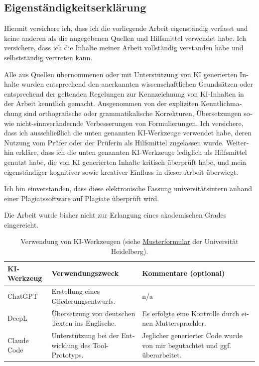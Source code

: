 \documentclass[
    pdftex,
    final,
    11pt,
    a4paper,
    parskip=false, %
    twoside, %
    footheight=0mm, %
    footinclude=false,
    toc=bibliography, %
    toc=listof %
]{scrbook} %
\begin{document}
\begin{otherlanguage}{ngerman}
\chapter*{Eigenständigkeitserklärung}
	
\vspace{1cm}
\noindent
Hiermit versichere ich, dass ich die vorliegende Arbeit eigenständig verfasst und keine anderen als die angegebenen Quellen und Hilfsmittel verwendet habe.
Ich versichere, dass ich die Inhalte meiner Arbeit vollständig verstanden habe und selbstständig vertreten kann.

Alle aus Quellen übernommenen oder mit Unterstützung von KI generierten Inhalte wurden entsprechend den anerkannten wissenschaftlichen Grundsätzen oder entsprechend der geltenden Regelungen zur Kennzeichnung von KI-Inhalten in der Arbeit kenntlich gemacht.
Ausgenommen von der expliziten Kenntlichmachung sind orthografische oder grammatikalische Korrekturen, Übersetzungen sowie nicht-sinnverändernde Verbesserungen von Formulierungen.
Ich versichere, dass ich ausschließlich die unten genannten KI-Werkzeuge verwendet habe, deren Nutzung vom Prüfer oder der Prüferin als Hilfsmittel zugelassen wurde.
Weiterhin erkläre, dass ich die unten genannten KI-Werkzeuge lediglich als Hilfsmittel genutzt habe, die von KI generierten Inhalte kritisch überprüft habe, und mein eigenständiger kognitiver sowie kreativer Einfluss in dieser Arbeit überwiegt.

Ich bin einverstanden, dass diese elektronische Fassung universitätsintern anhand einer Plagiatssoftware auf Plagiate überprüft wird.

Die Arbeit wurde bisher nicht zur Erlangung eines akademischen Grades eingereicht.

\begin{table}[h!]
\centering
\begin{tabularx}{\linewidth}{|l|X|X|}
\hline
\textbf{KI-Werkzeug} & \textbf{Verwendungszweck} & \textbf{Kommentare (optional)} \\
\hline
ChatGPT & Erstellung eines Gliederungsentwurfs. & n/a \\
\hline
DeepL & Übersetzung von deutschen Texten ins Englische. & Es erfolgte eine Kontrolle durch einen Muttersprachler. \\ \hline
Claude Code & Unterstützung bei der Entwicklung des Tool-Prototyps. & Jeglicher generierter Code wurde von mir begutachtet und ggf. überarbeitet. \\
\hline
\end{tabularx}
\caption{Verwendung von KI-Werkzeugen (siehe \href{https://backend.heiskills.uni-heidelberg.de/de/dokumente/ki-formular-de/download}{Musterformular} der Universität Heidelberg).}
\end{table}


\end{otherlanguage}
\end{document}
